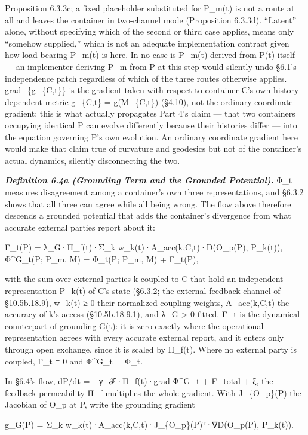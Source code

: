 \documentclass[
]{article}
\begin{document}
Proposition 6.3.3c; a fixed placeholder substituted for P\_m(t) is not a
route at all and leaves the container in two-channel mode (Proposition
6.3.3d). ``Latent'' alone, without specifying which of the second or
third case applies, means only ``somehow supplied,'' which is not an
adequate implementation contract given how load-bearing P\_m(t) is here.
In no case is P\_m(t) derived from P(t) itself --- an implementer
deriving P\_m from P at this step would silently undo §6.1's
independence patch regardless of which of the three routes otherwise
applies. grad\_\{g\_\{C,t\}\} is the gradient taken with respect to
container C's own history-dependent metric g\_\{C,t\} = g(M\_\{C,t\})
(§4.10), not the ordinary coordinate gradient: this is what actually
propagates Part 4's claim --- that two containers occupying identical P
can evolve differently because their histories differ --- into the
equation governing P's own evolution. An ordinary coordinate gradient
here would make that claim true of curvature and geodesics but not of
the container's actual dynamics, silently disconnecting the two.

\emph{\textbf{Definition 6.4a (Grounding Term and the Grounded
Potential).}} Φ\_t measures disagreement among a container's own three
representations, and §6.3.2 shows that all three can agree while all
being wrong. The flow above therefore descends a grounded potential that
adds the container's divergence from what accurate external parties
report about it:

Γ\_t(P) = λ\_G·Π\_f(t)·Σ\_k w\_k(t)·A\_acc(k,C,t)·D(O\_p(P), P\_k(t)),
Φ\^{}G\_t(P; P\_m, M) = Φ\_t(P; P\_m, M) + Γ\_t(P),

with the sum over external parties k coupled to C that hold an
independent representation P\_k(t) of C's state (§6.3.2; the external
feedback channel of §10.5b.18.9), w\_k(t) ≥ 0 their normalized coupling
weights, A\_acc(k,C,t) the accuracy of k's access (§10.5b.18.9.1), and
λ\_G \textgreater{} 0 fitted. Γ\_t is the dynamical counterpart of
grounding G(t): it is zero exactly where the operational representation
agrees with every accurate external report, and it enters only through
open exchange, since it is scaled by Π\_f(t). Where no external party is
coupled, Γ\_t ≡ 0 and Φ\^{}G\_t = Φ\_t.

In §6.4's flow, dP/dt = −γ\_ℱ·Π\_f(t)·grad Φ\^{}G\_t + F\_total + ξ, the
feedback permeability Π\_f multiplies the whole gradient. With
J\_\{O\_p\}(P) the Jacobian of O\_p at P, write the grounding gradient

g\_G(P) = Σ\_k w\_k(t)·A\_acc(k,C,t)·J\_\{O\_p\}(P)ᵀ·∇D(O\_p(P),
P\_k(t)).
\end{document}
